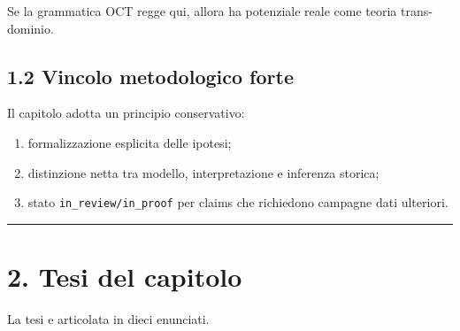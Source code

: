 Se la grammatica OCT regge qui, allora ha potenziale reale come teoria trans-dominio.

\subsection{1.2 Vincolo metodologico forte}

Il capitolo adotta un principio conservativo:

\begin{enumerate}
\def\labelenumi{\arabic{enumi}.}
\tightlist
\item
  formalizzazione esplicita delle ipotesi;
\item
  distinzione netta tra modello, interpretazione e inferenza storica;
\item
  stato \texttt{in\_review/in\_proof} per claims che richiedono campagne dati ulteriori.
\end{enumerate}

\begin{center}\rule{0.5\linewidth}{0.5pt}\end{center}

\section{2. Tesi del capitolo}

La tesi e articolata in dieci enunciati.

